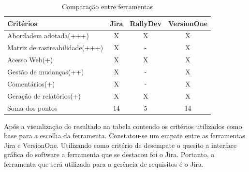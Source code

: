 \begin{table}[H]
    \centering
    \label{comparaFerramentas}
    \caption{Comparação entre ferramentas}
    \begin{tabular}{l|c|c|c}
        \hline
        Critérios & Jira &  RallyDev & VersionOne \\ [6pt]
        \hline
        Abordadem adotada(+++) & X & X & X\\
        \hline
        Matriz de rastreabilidade(+++) & X & - & X \\
        \hline
        Acesso Web(+) & X & X & X \\
        \hline
        Gestão de mudanças(++) & X & - & X\\
        \hline
        Comentários(+) & X & - & X \\
        \hline
        Geração de relatórios(+) & X & X & X \\
        \hline
        Soma dos pontos & 14 & 5 & 14 \\
        \hline
    \end{tabular}
\end{table}

Após a visualização do resultado na tabela contendo os critérios utilizados como base para a escolha da ferramenta. Constatou-se um empate entre as ferramentas Jira e VersionOne. Utilizando como critério de desempate o quesito a interface gráfica do software a ferramenta que se destacou foi o Jira. Portanto, a ferramenta que será utilizada para a gerência de requisitos é o Jira.
